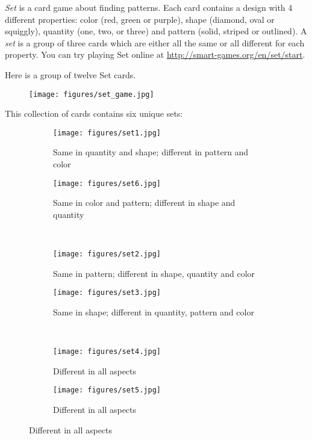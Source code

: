 \begin{problem} %
\emph{Set} is a card game about finding patterns.
Each card contains a design with 4 different properties: color (red, green or purple), shape (diamond, oval or squiggly), quantity (one, two, or three) and pattern (solid, striped or outlined).
A \emph{set} is a group of three cards which are either all the same or all different for each property.
You can try playing Set online at \url{http://smart-games.org/en/set/start}.

Here is a group of twelve Set cards.
\begin{figure}[H]
    \centering
    \texttt{[image: figures/set\_game.jpg]}
\end{figure}

This collection of cards contains six unique sets:
\begin{figure}[H] %
\captionsetup[subfigure]{justification=centering}
\centering
\begin{subfigure}{.47\textwidth}
    \centering
    \texttt{[image: figures/set1.jpg]}
    \caption{Same in quantity and shape; different in pattern and color}
\end{subfigure}
%
\begin{subfigure}{.47\textwidth}
    \centering
    \texttt{[image: figures/set6.jpg]}
    \caption{Same in color and pattern; different in shape and quantity}
\end{subfigure}
\\
\begin{subfigure}{.47\textwidth}
    \centering
    \texttt{[image: figures/set2.jpg]}
    \caption{Same in pattern; different in shape, quantity and color}
\end{subfigure}
%
\begin{subfigure}{.47\textwidth}
    \centering
    \texttt{[image: figures/set3.jpg]}
    \caption{Same in shape; different in quantity, pattern and color}
\end{subfigure}
\\
\begin{subfigure}{.47\textwidth}
    \centering
    \texttt{[image: figures/set4.jpg]}
    \caption{Different in all aspects}
\end{subfigure}
%
\begin{subfigure}{.47\textwidth}
    \centering
    \texttt{[image: figures/set5.jpg]}
    \caption{Different in all aspects}
\end{subfigure}
\end{figure}


\end{problem}
